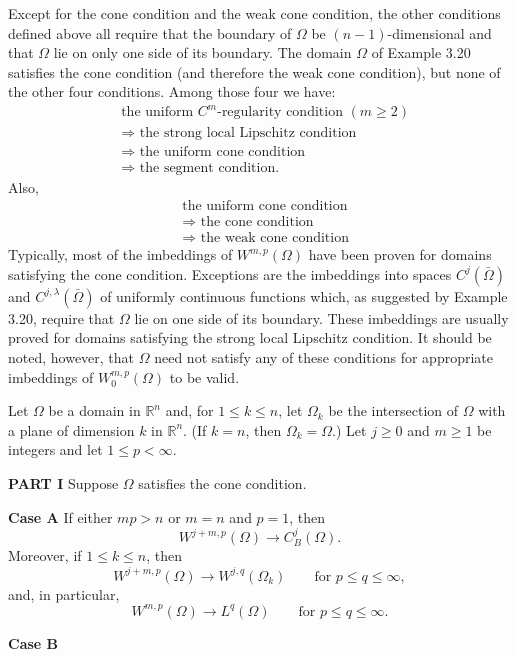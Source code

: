 \begin{para}
  Except for the cone condition and the weak cone condition, the other conditions defined above all require that the boundary of $\Omega$ be $(n-1)$-dimensional and that $\Omega$ lie on only one side of its boundary. The domain $\Omega$ of Example 3.20
  satisfies the cone condition (and therefore the weak cone condition), but none of the other four conditions. Among those four we have:
  \begin{align*}
    & \text{the uniform $C^m$-regularity condition $(m \geq 2)$} \\
    & \text{$\Longrightarrow$ the strong local Lipschitz condition} \\
    & \text{$\Longrightarrow$ the uniform cone condition} \\
    & \text{$\Longrightarrow$ the segment condition.}
  \end{align*}
  Also,
  \begin{align*}
    & \text{the uniform cone condition} \\
    & \text{$\Longrightarrow$ the cone condition} \\
    & \text{$\Longrightarrow$ the weak cone condition}
  \end{align*}
  Typically, most of the imbeddings of $W^{m, p}(\Omega)$ have been proven for domains
  satisfying the cone condition. Exceptions are the imbeddings into spaces $C^j(\bar{\Omega})$
  and $C^{j, \lambda}(\bar{\Omega})$ of uniformly continuous functions which, as suggested by 
  Example 3.20, require that $\Omega$ lie on one side of its boundary. These imbeddings are 
  usually proved for domains satisfying the strong local Lipschitz condition. It should be noted, 
  however, that $\Omega$ need not satisfy any of these conditions for appropriate imbeddings of 
  $W_0^{m, p}(\Omega)$ to be valid.
\end{para}

\begin{theorem}
  Let $\Omega$ be a domain in $\mathbb{R}^n$ and, for $1\leq k\leq n$,
  let $\Omega_k$ be the intersection of $\Omega$ with a plane of dimension $k$
  in $\mathbb{R}^n$. (If $k=n$, then $\Omega_k = \Omega.$)
  Let $j\geq 0$ and $m\geq 1$ be integers and let $1\leq p < \infty$.

  \noindent\textbf{PART I} Suppose $\Omega$ satisfies the cone condition.

  \noindent\textbf{Case A} If either $mp > n$ or $m=n$ and $p=1$, then
  \begin{equation}
    W^{j+m, p}(\Omega) \to C_B^j(\Omega).
  \end{equation}
  Moreover, if $1\leq k\leq n$, then
  \begin{equation}
    W^{j+m, p}(\Omega) \to W^{j, q}(\Omega_k)\qquad \text{for } p\leq q\leq\infty,
  \end{equation}
  and, in particular,
  \[W^{m,p}(\Omega) \to L^q(\Omega)\qquad \text{for } p\leq q\leq\infty.\]

  \noindent \textbf{Case B}
\end{theorem}


